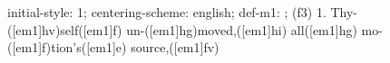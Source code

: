initial-style: 1;
centering-scheme: english;
def-m1: \grealign;
(f3) 1. Thy-([em1]hv)self([em1]f) un-([em1]hg)moved,([em1]hi) all([em1]hg) mo-([em1]f)tion's([em1]e) source,([em1]fv)